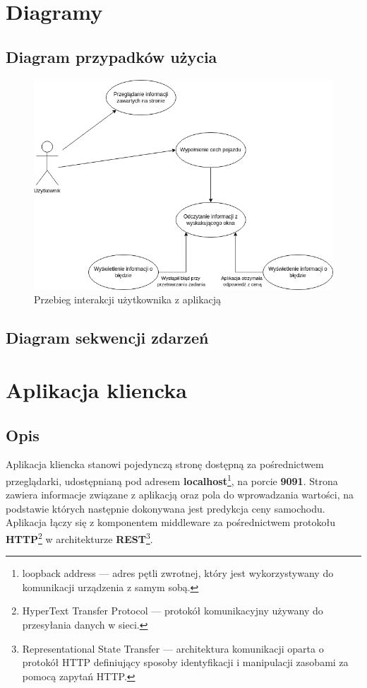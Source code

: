 \documentclass[12pt, a4paper]{report}
\begin{document}
\chapter{Diagramy}
\section{Diagram przypadków użycia}
\begin{figure}[H]
    \centering
    \includegraphics[width=1\textwidth]{diagrams/use_case_diagram.png}
    \caption{Przebieg interakcji użytkownika z aplikacją}
\end{figure}
\section{Diagram sekwencji zdarzeń}

\chapter{Aplikacja kliencka}
\section{Opis}
Aplikacja kliencka stanowi pojedynczą stronę dostępną za pośrednictwem przeglądarki,
udostępnianą pod adresem \textbf{localhost}\footnote{loopback address --- adres pętli zwrotnej, który jest wykorzystywany do komunikacji urządzenia z samym sobą.},
na porcie \textbf{9091}. Strona zawiera informacje związane z aplikacją oraz pola do wprowadzania wartości,
na podstawie których następnie dokonywana jest predykcja ceny samochodu. Aplikacja łączy się z komponentem
middleware za pośrednictwem protokołu \textbf{HTTP}\footnote{HyperText Transfer Protocol --- protokół komunikacyjny używany do przesyłania danych w sieci.}
 w architekturze 
\textbf{REST}\footnote{Representational State Transfer --- architektura komunikacji oparta o protokół HTTP
    definiujący sposoby identyfikacji i manipulacji zasobami za pomocą zapytań HTTP.}.\@
\end{document}
